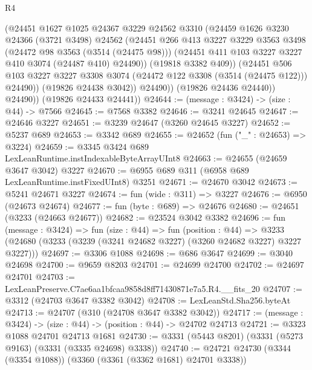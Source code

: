 \begin{lexlean}{R4}
\begin{coremodule}
                  (@24451
                    @1627
                    @1025
                    @24367
                    @3229
                    @24562
                    @3310
                    (@24459
                      @1626
                      @3230
                      @24366
                      (@3721 @3498)
                      @24562
                      (@24451
                        @266
                        @413
                        @3227
                        @3229
                        @3563
                        @3498
                        (@24472 @98 @3563 (@3514 (@24475 @98)))
                        (@24451 @411 @103 @3227 @3227 @410 @3074 (@24487 @410) @24490))
                      (@19818 @3382 @409))
                    (@24451
                      @506
                      @103
                      @3227
                      @3227
                      @3308
                      @3074
                      (@24472 @122 @3308 (@3514 (@24475 @122)))
                      @24490))
                  (@19826 @24438 @3042))
                @24490))
            (@19826 @24436 @24440))
          @24490))
      (@19826 @24433 @24441))
@24644 := (message : @3424) -> (size : @44) -> @7566
@24645 := @7568 @3382
@24646 := @3241 @24645
@24647 := @24646 @3227
@24651 := @3239 @24647 (@3260 @24645 @3227)
@24652 := @5237 @689
@24653 := @3342 @689
@24655 := @24652 (fun ("_" : @24653) => @3224)
@24659 := @3345 @3424 @689 LexLeanRuntime.instIndexableByteArrayUInt8
@24663 := @24655 (@24659 @3647 @3042) @3227
@24670 := @6955 @689 @311 (@6958 @689 LexLeanRuntime.instFixedUInt8) @3251
@24671 := @24670 @3042
@24673 := @5241 @24671 @3227
@24674 := fun (wide : @311) => @3227
@24676 := @6950 (@24673 @24674)
@24677 := fun (byte : @689) => @24676
@24680 := @24651 (@3233 (@24663 @24677))
@24682 := @23524 @3042 @3382
@24696 := fun (message : @3424) =>
  fun (size : @44) =>
  fun (position : @44) =>
  @3233 (@24680 (@3233 (@3239 (@3241 @24682 @3227) (@3260 @24682 @3227) @3227 @3227)))
@24697 := @3306 @1088
@24698 := @686 @3647
@24699 := @3040 @24698
@24700 := @9659 @8203
@24701 := @24699 @24700
@24702 := @24697 @24701
@24703 := LexLeanPreserve.C7ae6aa1bfcaa9858d8ff71430871e7a5.R4.__fits_20
@24707 := @3312 (@24703 @3647 @3382 @3042)
@24708 := LexLeanStd.Sha256.byteAt
@24713 := @24707 (@310 (@24708 @3647 @3382 @3042))
@24717 := (message : @3424) -> (size : @44) -> (position : @44) -> @24702 @24713
@24721 := @3323 @1088 @24701 @24713 @1681
@24730 := @3331 (@5443 @8201) (@3331 (@5273 @9163) (@3331 (@3335 @24698) @3338))
@24740 := @24721 @24730 (@3344 (@3354 @1088)) (@3360 (@3361 (@3362 @1681) @24701 @3338))

\end{coremodule}
\end{lexlean}
